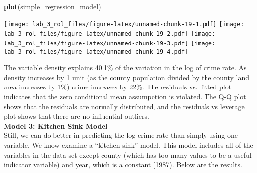 \documentclass[
]{article}
\newenvironment{Shaded}{\begin{snugshade}}{\end{snugshade}}
\newcommand{\KeywordTok}[1]{\textcolor[rgb]{0.13,0.29,0.53}{\textbf{#1}}}
\newcommand{\NormalTok}[1]{#1}
\begin{document}
\begin{Shaded}
\begin{Highlighting}[]
\KeywordTok{plot}\NormalTok{(simple_regression_model)}
\end{Highlighting}
\end{Shaded}

\texttt{[image: lab\_3\_rol\_files/figure-latex/unnamed-chunk-19-1.pdf]}
\texttt{[image: lab\_3\_rol\_files/figure-latex/unnamed-chunk-19-2.pdf]}
\texttt{[image: lab\_3\_rol\_files/figure-latex/unnamed-chunk-19-3.pdf]}
\texttt{[image: lab\_3\_rol\_files/figure-latex/unnamed-chunk-19-4.pdf]}

The variable density explains 40.1\% of the variation in the log of
crime rate. As density increases by 1 unit (as the county population
divided by the county land area increases by 1\%) crime increases by
22\%. The residuals vs.~fitted plot indicates that the zero conditional
mean assumpotion is violated. The Q-Q plot shows that the residuals are
normally distributed, and the residuals vs leverage plot shows that
there are no influential outliers.\\

\textbf{Model 3: Kitchen Sink Model}\\
Still, we can do better in predicting the log crime rate than simply
using one variable. We know examine a ``kitchen sink'' model. This model
includes all of the variables in the data set except county (which has
too many values to be a useful indicator variable) and year, which is a
constant (1987). Below are the results.
\end{document}

